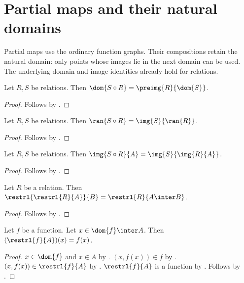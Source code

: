 

\section{Partial maps and their natural domains}

Partial maps use the ordinary function graphs. Their compositions retain the
natural domain: only points whose images lie in the next domain can be used.
The underlying domain and image identities already hold for relations.

\begin{theorem}\label{relation_composition_domain}
    Let $R,S$ be relations.
    Then $\dom{S\circ R}=\preimg{R}{\dom{S}}$.
\end{theorem}
\begin{proof}
    Follows by .
\end{proof}

\begin{theorem}\label{relation_composition_range}
    Let $R,S$ be relations.
    Then $\ran{S\circ R}=\img{S}{\ran{R}}$.
\end{theorem}
\begin{proof}
    Follows by .
\end{proof}

\begin{theorem}\label{relation_composition_image}
    Let $R,S$ be relations.
    Then $\img{S\circ R}{A}=\img{S}{\img{R}{A}}$.
\end{theorem}
\begin{proof}
    Follows by .
\end{proof}

\begin{theorem}\label{restriction_intersection}
    Let $R$ be a relation.
    Then $\restrl{\restrl{R}{A}}{B}=\restrl{R}{A\inter B}$.
\end{theorem}
\begin{proof}
    Follows by .
\end{proof}

\begin{theorem}\label{restriction_apply_on_domain}
    Let $f$ be a function.
    Let $x\in\dom{f}\inter A$.
    Then $(\restrl{f}{A})(x)=f(x)$.
\end{theorem}
\begin{proof}
    $x\in\dom{f}$ and $x\in A$ by .
    $(x,f(x))\in f$ by .
    $(x,f(x))\in\restrl{f}{A}$ by .
    $\restrl{f}{A}$ is a function by .
    Follows by .
\end{proof}

